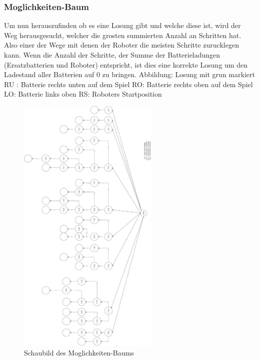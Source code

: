 \documentclass[a4paper,12pt,arial]{scrartcl}
\begin{document}
\subsubsection{Moglichkeiten-Baum}
Um nun herauszufinden ob es eine Losung gibt und welche diese ist, wird der Weg herausgesucht, welcher die grosten summierten Anzahl an Schritten hat.
Also einer der Wege mit denen der Roboter die meisten Schritte zurucklegen kann.
Wenn die Anzahl der Schritte, der Summe der Batterieladungen (Ersatzbatterien und Roboter) entspricht, ist dies eine korrekte Losung um den Ladestand aller Batterien auf 0 zu bringen.
Abbildung:
Losung mit grun markiert
    RU : Batterie rechts unten auf dem Spiel
    RO: Batterie rechts oben auf dem Spiel
    LO: Batterie links oben
    RS: Roboters Startposition
\par
\newpage

\begin{figure}[htpb]
    \centering
    \includegraphics[width=0.6\textwidth]{rotated_baum_yeah.jpg}
    \caption{Schaubild des Moglichkeiten-Baums
    }
    \label{fig:moeglichkeiten_baum}
\end{figure}

\newpage
\end{document}
